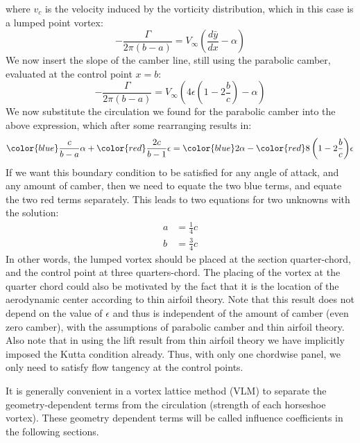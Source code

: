 \documentclass{article}
\begin{document}
where $v_c$ is the velocity induced by the vorticity distribution, which in this case is a lumped point vortex:
\begin{equation}
-\frac{\Gamma}{2 \pi (b - a)} = V_\infty \left(\frac{d\bar{y}}{dx} - \alpha \right)
\end{equation}
We now insert the slope of the camber line, still using the parabolic camber, evaluated at the control point $x = b$:
\begin{equation}
-\frac{\Gamma}{2 \pi (b - a)} = V_\infty \left(4 \epsilon \left(1 - 2 \frac{b}{c} \right) - \alpha \right)
\end{equation}
We now substitute the circulation we found for the parabolic camber into the above expression, which after some rearranging results in:
\begin{equation}
{\color{blue}\frac{c}{b - a}} \alpha + {\color{red}\frac{2c}{b -1}} \epsilon = {\color{blue}2} \alpha - {\color{red}8\left(1 - 2 \frac{b}{c} \right)}\epsilon
\end{equation}
If we want this boundary condition to be satisfied for any angle of attack, and any amount of camber, then we need to equate the two blue terms, and equate the two red terms separately.  This leads to two equations for two unknowns with the solution:
\begin{align}
a &= \frac{1}{4} c\\
b &= \frac{3}{4} c
\end{align}
In other words, the lumped vortex should be placed at the section quarter-chord, and the control point at three quarters-chord.  The placing of the vortex at the quarter chord could also be motivated by the fact that it is the location of the aerodynamic center according to thin airfoil theory.  Note that this result does not depend on the value of $\epsilon$ and thus is independent of the amount of camber (even zero camber), with the assumptions of parabolic camber and thin airfoil theory.  Also note that in using the lift result from thin airfoil theory we have implicitly imposed the Kutta condition already. Thus, with only one chordwise panel, we only need to satisfy flow tangency at the control points.


It is generally convenient in a vortex lattice method (VLM) to separate the geometry-dependent terms from the circulation (strength of each horseshoe vortex).  These geometry dependent terms will be called influence coefficients in the following sections.
\end{document}
